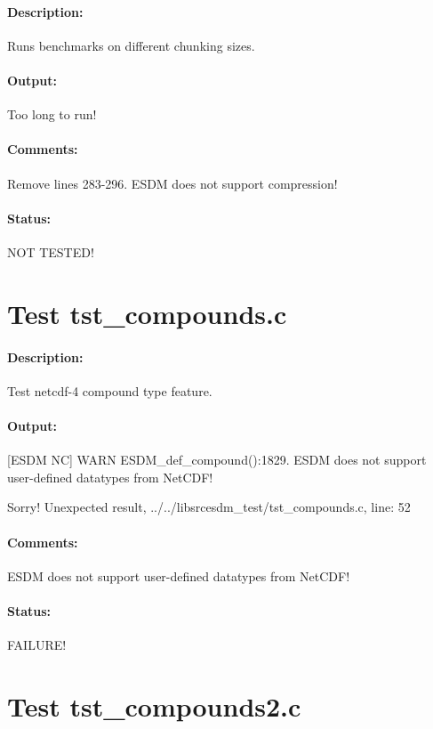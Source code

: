 \paragraph{Description:} Runs benchmarks on different chunking sizes.

\paragraph{Output:} Too long to run!

\paragraph{Comments:} Remove lines 283-296. ESDM does not support compression!

\paragraph{Status:} NOT TESTED!

\section{Test tst\_compounds.c}

\paragraph{Description:} Test netcdf-4 compound type feature.

\paragraph{Output:} [ESDM NC] WARN ESDM\_def\_compound():1829. ESDM does not support user-defined datatypes from NetCDF!

Sorry! Unexpected result, ../../libsrcesdm\_test/tst\_compounds.c, line: 52

\paragraph{Comments:} ESDM does not support user-defined datatypes from NetCDF!

\paragraph{Status:} FAILURE!

\section{Test tst\_compounds2.c}

